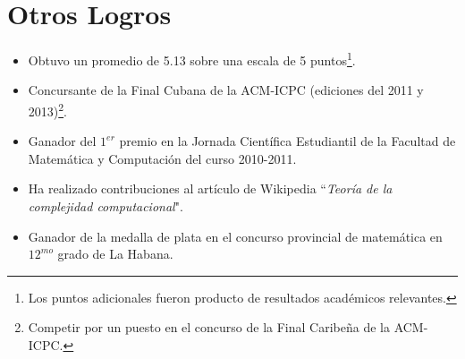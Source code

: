 \documentclass[]{friggeri-cv}
\begin{document}
\section{Otros Logros}
\begin{itemize}[noitemsep, nolistsep]

	\item Obtuvo un promedio de 5.13 sobre una escala de 5 puntos\footnote{Los puntos adicionales fueron producto de resultados académicos relevantes.}.\\

	\item Concursante de la Final Cubana de la ACM-ICPC (ediciones del 2011 y 2013)\footnote{Competir por un puesto en el concurso de la Final Caribeña de la ACM-ICPC.}.\\

	\item Ganador del $1^{er}$ premio en la Jornada Científica Estudiantil de la Facultad de Matemática y Computación del curso 2010-2011.\\
	
	\item Ha realizado contribuciones al artículo de Wikipedia ``\emph{Teoría de la complejidad computacional}".\\
		
	\item Ganador de la medalla de plata en el concurso provincial de matemática en $12^{mo}$ grado de La Habana.\\
	
	
	
	
\end{itemize}
\end{document}
